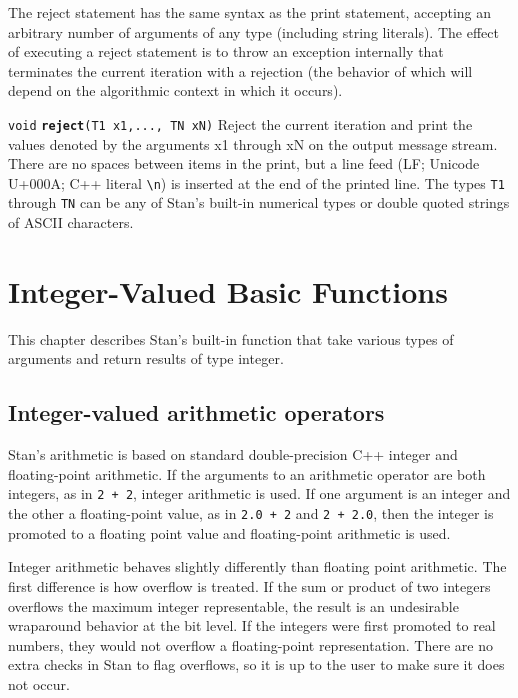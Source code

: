 \documentclass[
  10pt,
]{book}
\begin{document}
The reject statement has the same syntax as the print statement,
accepting an arbitrary number of arguments of any type (including
string literals). The effect of executing a reject statement is to
throw an exception internally that terminates the current iteration
with a rejection (the behavior of which will depend on the algorithmic
context in which it occurs).


\texttt{void} \textbf{\texttt{reject}}\texttt{(T1\ x1,...,\ TN\ xN)}\newline
Reject the current iteration and print the values denoted by the
arguments x1 through xN on the output message stream. There are no
spaces between items in the print, but a line feed (LF; Unicode
U+000A; C++ literal \texttt{\textquotesingle{}\textbackslash{}n\textquotesingle{}}) is inserted at the end of the printed
line. The types \texttt{T1} through \texttt{TN} can be any of Stan's built-in
numerical types or double quoted strings of ASCII characters.

\hypertarget{integer-valued-basic-functions}{%
\chapter{Integer-Valued Basic Functions}\label{integer-valued-basic-functions}}

This chapter describes Stan's built-in function that take various
types of arguments and return results of type integer.

\hypertarget{int-arithmetic}{%
\section{Integer-valued arithmetic operators}\label{int-arithmetic}}

Stan's arithmetic is based on standard double-precision C++ integer
and floating-point arithmetic. If the arguments to an arithmetic
operator are both integers, as in \texttt{2\ +\ 2}, integer arithmetic is used.
If one argument is an integer and the other a floating-point value, as
in \texttt{2.0\ +\ 2} and \texttt{2\ +\ 2.0}, then the integer is promoted to a floating
point value and floating-point arithmetic is used.

Integer arithmetic behaves slightly differently than floating point
arithmetic. The first difference is how overflow is treated. If the
sum or product of two integers overflows the maximum integer
representable, the result is an undesirable wraparound behavior at the
bit level. If the integers were first promoted to real numbers, they
would not overflow a floating-point representation. There are no
extra checks in Stan to flag overflows, so it is up to the user to
make sure it does not occur.
\end{document}
